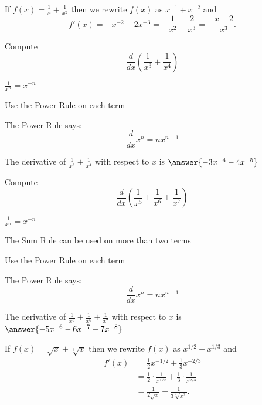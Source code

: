 \documentclass[handout]{ximera}
\begin{document}
\begin{example} %
 If $f(x) = \frac{1}{x} + \frac{1}{x^2}$ then we rewrite $f(x)$ as $x^{-1} + x^{-2}$ and 
\[f'(x) = -x^{-2} -2x^{-3} = -\frac{1}{x^2} - \frac{2}{x^3} = - \frac{x + 2}{x^3}.\]
\end{example}

\begin{problem} %
  Compute 
  \[
  \frac{d}{dx} \left(\frac{1}{x^3} + \frac{1}{x^4}\right)
  \]
  
    \begin{hint}
		 $\frac{1}{x^n} = x^{-n}$
		\end{hint}
		\begin{hint}
      Use the Power Rule on each term
    \end{hint}
    \begin{hint}
      The Power Rule says:
      \[
      \frac{d}{dx} x^n = nx^{n-1}
      \]
    \end{hint}    
		The derivative of $\frac{1}{x^3} + \frac{1}{x^4}$ with respect to $x$ is
		 $\answer{-3x^{-4} -4x^{-5}}$
	
\end{problem}


\begin{problem} %
  Compute 
  \[
  \frac{d}{dx} \left(\frac{1}{x^5} + \frac{1}{x^6} + \frac{1}{x^7}\right)
  \]
  
    \begin{hint}
		 $\frac{1}{x^n} = x^{-n}$
		\end{hint}
		\begin{hint}
		  The Sum Rule can be used on more than two terms
		\end{hint}
		\begin{hint}
      Use the Power Rule on each term
    \end{hint}
    \begin{hint}
      The Power Rule says:
      \[
      \frac{d}{dx} x^n = nx^{n-1}
      \]
    \end{hint}    
		The derivative of $\frac{1}{x^5} + \frac{1}{x^6} + \frac{1}{x^7}$ with respect to $x$ is
		 $\answer{-5x^{-6} -6x^{-7} - 7x^{-8}}$
	\
\end{problem}



\begin{example} %
 If $f(x) = \sqrt x + \sqrt[3] x$ then we rewrite $f(x)$ as $x^{1/2} + x^{1/3}$ and
\begin{align*}
f'(x) &= \tfrac12 x^{-1/2} + \tfrac13 x^{-2/3} \\
&= \tfrac12 \cdot \frac{1}{x^{1/2}} + \tfrac13 \cdot \frac{1}{x^{2/3}}\\
&= \frac{1}{2\sqrt x} + \frac{1}{3\sqrt[3] {x^2}}.
\end{align*}
\end{example}
\end{document}
